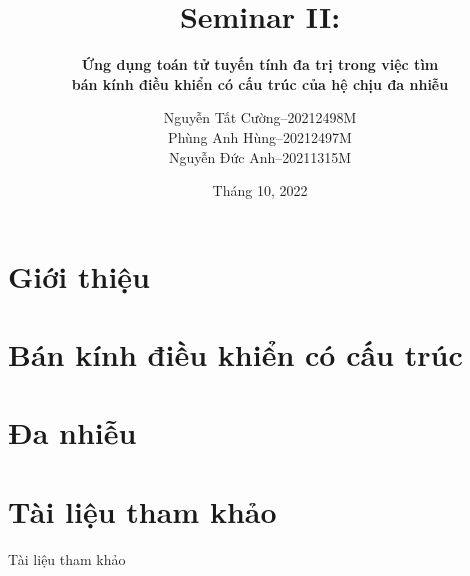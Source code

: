 \documentclass[aspectratio=169]{beamer}
\title{Seminar II:}
\subtitle{\textbf{Ứng dụng toán tử tuyến tính đa trị trong việc tìm\\bán kính điều khiển có cấu trúc của hệ chịu đa nhiễu}}
\author{Nguyễn Tất Cường--20212498M\\Phùng Anh Hùng--20212497M\\Nguyễn Đức Anh--20211315M}
\date{Tháng 10, 2022}
\begin{document}
\begin{frame}
	\maketitle
\end{frame}

\section{Giới thiệu}


\section{Bán kính điều khiển có cấu trúc}

\section{Đa nhiễu}



\section{Tài liệu tham khảo}
\begin{frame}{Tài liệu tham khảo}
    \nocite{*}
    
    
\end{frame}

\begin{frame}{~}
    \Large \color{hustred}{Cảm ơn mọi người đã chú ý lắng nghe!}
\end{frame}
\end{document}
